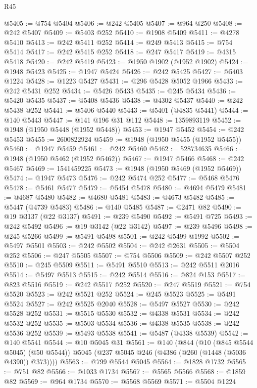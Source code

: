 \begin{lexlean}{R45}
\begin{coremodule}
{@5405 := @754 @5404
@5406 := @242 @5405
@5407 := @964 @250
@5408 := @242 @5407
@5409 := @5403 @252
@5410 := @1908 @5409
@5411 := @4278 @5410
@5413 := @242 @5411 @252
@5414 := @249 @5413
@5415 := @754 @5414
@5417 := @242 @5415 @252
@5418 := @247 @5417
@5419 := @4315 @5418
@5420 := @242 @5419
@5423 := @1950 @1902 (@1952 @1902)
@5424 := @1948 @5423
@5425 := @1947 @5424
@5426 := @242 @5425
@5427 := @5403 @1224
@5428 := @1223 @5427
@5431 := @296 @5428 @5052 @1966
@5433 := @242 @5431 @252
@5434 := @5426 @5433
@5435 := @245 @5434
@5436 := @5420 @5435
@5437 := @5408 @5436
@5438 := @4302 @5437
@5440 := @242 @5438 @252
@5441 := @5406 @5440
@5443 := @5401 (@4835 @5441)
@5444 := @140 @5443
@5447 := @141 @196 @31 @112
@5448 := 1359893119
@5452 := @1948 (@1950 @5448 (@1952 @5448))
@5453 := @1947 @5452
@5454 := @242 @5453
@5455 := 2600822924
@5459 := @1948 (@1950 @5455 (@1952 @5455))
@5460 := @1947 @5459
@5461 := @242 @5460
@5462 := 528734635
@5466 := @1948 (@1950 @5462 (@1952 @5462))
@5467 := @1947 @5466
@5468 := @242 @5467
@5469 := 1541459225
@5473 := @1948 (@1950 @5469 (@1952 @5469))
@5474 := @1947 @5473
@5476 := @242 @5474 @252
@5477 := @5468 @5476
@5478 := @5461 @5477
@5479 := @5454 @5478
@5480 := @4694 @5479
@5481 := @4687 @5480
@5482 := @4680 @5481
@5483 := @4673 @5482
@5485 := @5447 (@4739 @5483)
@5486 := @140 @5485
@5487 := @2471 @82
@5490 := @19 @3137 (@22 @3137)
@5491 := @239 @5490
@5492 := @5491 @725
@5493 := @242 @5492
@5496 := @19 @3142 (@22 @3142)
@5497 := @239 @5496
@5498 := @245 @5266
@5499 := @5491 @5498
@5501 := @242 @5499 @1992
@5502 := @5497 @5501
@5503 := @242 @5502
@5504 := @242 @2631
@5505 := @5504 @252
@5506 := @247 @5505
@5507 := @754 @5506
@5509 := @242 @5507 @252
@5510 := @245 @5509
@5511 := @5491 @5510
@5513 := @242 @5511 @2016
@5514 := @5497 @5513
@5515 := @242 @5514
@5516 := @824 @153
@5517 := @823 @5516
@5519 := @242 @5517 @252
@5520 := @247 @5519
@5521 := @754 @5520
@5523 := @242 @5521 @252
@5524 := @245 @5523
@5525 := @5491 @5524
@5527 := @242 @5525 @2040
@5528 := @5497 @5527
@5530 := @242 @5528 @252
@5531 := @5515 @5530
@5532 := @4338 @5531
@5534 := @242 @5532 @252
@5535 := @5503 @5534
@5536 := @4338 @5535
@5538 := @242 @5536 @252
@5539 := @5493 @5538
@5541 := @5487 (@4338 @5539)
@5542 := @140 @5541
@5544 := @10 @5045 @31
@5561 := @140
    (@844
      (@10 (@845 @5544 @5045) (@50 @5544))
      @5045
      (@237 @5045 @246 (@4386 (@260 (@1448 (@5036 @4390)) @373))))
@5563 := @799 @5544 @5045
@5564 := @1828 @1732
@5565 := @751 @82
@5566 := @1033 @1734
@5567 := @5565 @5566
@5568 := @1859 @82
@5569 := @964 @1734
@5570 := @5568 @5569
@5571 := @5504 @1224
}
\end{coremodule}
\end{lexlean}
